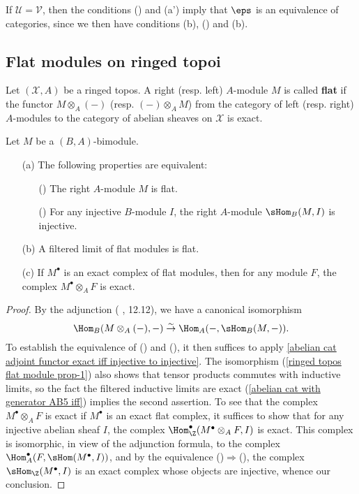 \begin{remark}
If $\mathscr{U}=\mathscr{V}$, then the conditions () and (a') imply that $\eps$ is an equivalence of categories, since we then have conditions (b), () and (b).
\end{remark}

\subsection{Flat modules on ringed topoi}
Let $(\mathcal{X},A)$ be a ringed topos. A right (resp. left) $A$-module $M$ is called \textbf{flat} if the functor $M\otimes_A(-)$ (resp. $(-)\otimes_AM$) from the category of left (resp. right) $A$-modules to the category of abelian sheaves on $\mathcal{X}$ is exact.

\begin{proposition}\label{ringed topos flat module prop}
Let $M$ be a $(B,A)$-bimodule.
\begin{enumerate}
    \item[(a)] The following properties are equivalent:
    \begin{enumerate}
        \item[(\rmnum{1})] The right $A$-module $M$ is flat.
        \item[(\rmnum{2})] For any injective $B$-module $I$, the right $A$-module $\sHom_B(M,I)$ is injective.
    \end{enumerate}
    \item[(b)] A filtered limit of flat modules is flat.
    \item[(c)] If $M^\bullet$ is an exact complex of flat modules, then for any module $F$, the complex $M^\bullet\otimes_AF$ is exact.
\end{enumerate}
\end{proposition}
\begin{proof}
By the adjunction (\cite{SGA4-1} , 12.12), we have a canonical isomorphism
\begin{equation}\label{ringed topos flat module prop-1}
\Hom_B(M\otimes_A(-),-) \stackrel{\sim}{\to } \Hom_A(-,\sHom_B(M,-)).
\end{equation}
To establish the equivalence of () and (), it then suffices to apply \cref{abelian cat adjoint functor exact iff injective to injective}. The isomorphism (\ref{ringed topos flat module prop-1}) also shows that tensor products commutes with inductive limits, so the fact the filtered inductive limits are exact (\cref{abelian cat with generator AB5 iff}) implies the second assertion. To see that the complex $M^\bullet\otimes_AF$ is exact if $M^\bullet$ is an exact flat complex, it suffices to show that for any injective abelian sheaf $I$, the complex $\Hom^\bullet_\Z(M^\bullet\otimes_AF,I)$ is exact. This complex is isomorphic, in view of the adjunction formula, to the complex $\Hom^\bullet_A(F,\sHom(M^\bullet,I))$, and by the equivalence ()$\Rightarrow$(), the complex $\sHom_\Z(M^\bullet,I)$ is an exact complex whose objects are injective, whence our conclusion.
\end{proof}

